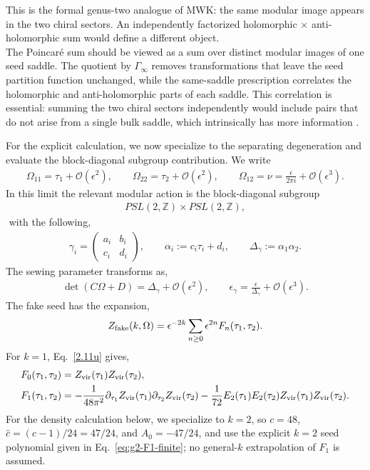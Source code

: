 \documentclass[12 pt]{article}
\begin{document}
\noindent
This is the formal genus-two analogue of MWK: the same modular image appears in the two chiral sectors. An independently factorized holomorphic $\times$ anti-holomorphic sum would define a different object.\\
The Poincar\'e sum should be viewed as a sum over distinct modular images of one seed saddle.  The quotient by $\Gamma_\infty$ removes transformations that leave the seed partition function unchanged, while the same-saddle prescription correlates the holomorphic and anti-holomorphic parts of each saddle.  This correlation is essential: summing the two chiral sectors independently would include pairs that do not arise from a single bulk saddle, which intrinsically has more information .

\noindent
For the explicit calculation, we now specialize to the separating degeneration and evaluate the block-diagonal subgroup contribution. We write
\begin{align}
    \Omega_{11}=\tau_1+\mathcal O(\epsilon^2),\qquad
    \Omega_{22}=\tau_2+\mathcal O(\epsilon^2),\qquad
    \Omega_{12}=\nu=\frac{\epsilon}{2\pi i}+\mathcal O(\epsilon^3).
\end{align}
In this limit the relevant modular action is the block-diagonal subgroup
\begin{align*}
    PSL(2,\mathbb Z)\times PSL(2,\mathbb Z),
\end{align*}
\,\,with the following, 
\begin{align}
    \gamma_i=
    \begin{pmatrix}
        a_i & b_i\\
        c_i & d_i
    \end{pmatrix},
    \qquad
    \alpha_i:=c_i\tau_i+d_i,
    \qquad
    \Delta_\gamma:=\alpha_1\alpha_2.
\end{align}
The sewing parameter transforms as,
\begin{align}
    \det(C\Omega+D)=\Delta_\gamma+\mathcal O(\epsilon^2),
    \qquad
    \epsilon_\gamma=\frac{\epsilon}{\Delta_\gamma}+\mathcal O(\epsilon^3).
    \label{eq:epsilon-transform}
\end{align}
The fake seed has the expansion,
\begin{align}
    Z_{\rm fake}(k,\Omega)
    =
    \epsilon^{-2k}
    \sum_{n\ge0}\epsilon^{2n}F_n(\tau_1,\tau_2).
    \label{eq:fake-separating-expansion}
\end{align}
For $k=1$, Eq.~\eqref{2.11u} gives,
\begin{align}
\begin{split}
    F_0(\tau_1,\tau_2)
    &=Z_{\rm vir}(\tau_1)Z_{\rm vir}(\tau_2),\\
    F_1(\tau_1,\tau_2)
    &=-\frac{1}{48\pi^2}
    \partial_{\tau_1}Z_{\rm vir}(\tau_1)
    \partial_{\tau_2}Z_{\rm vir}(\tau_2)
    -\frac{1}{72}E_2(\tau_1)E_2(\tau_2)
    Z_{\rm vir}(\tau_1)Z_{\rm vir}(\tau_2).
\end{split}
\end{align}
For the density calculation below, we specialize to $k=2$, so $c=48$, $\hat c=(c-1)/24=47/24$, and $A_0=-47/24$, and use the explicit $k=2$ seed polynomial given in Eq.~\eqref{eq:g2-F1-finite}; no general-$k$ extrapolation of $F_1$ is assumed.\\
\end{document}
